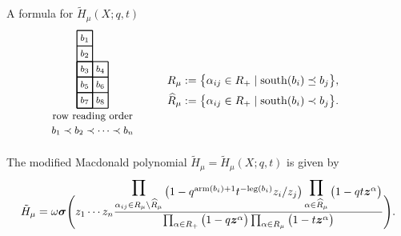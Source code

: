 \documentclass[dvipsnames]{beamer}
\newcommand{\zz}{{\boldsymbol z}}
\newcommand{\sigmabold}{\boldsymbol \sigma}
\newcommand{\Htild}{\tilde{H}}
\DeclareMathOperator{\pol}{pol}
\newcommand{\south}{{\mathrm{south}}}
\newcommand{\leg}{{\mathrm{leg}}}
\newcommand{\arm}{{\mathrm{arm}}}
\theoremstyle{definition}
\begin{document}
\begin{frame}{A formula for \(\Htild_\mu(X;q,t)\)}
  \begin{align*}
\quad \ \ \
\begin{tikzpicture}[scale = .49]
\begin{scope}
\draw[thick] (0,0) grid (1,5);
\draw[thick] (0,0) grid (2,3);
\node at (0.5, 4.5) { \footnotesize $b_1$};
\node at (0.5, 3.5) { \footnotesize $b_2$};
\node at (0.5, 2.5) { \footnotesize $b_3$};
\node at (1.5, 2.5) { \footnotesize $b_4$};
\node at (0.5, 1.5) { \footnotesize $b_5$};
\node at (1.5, 1.5) { \footnotesize $b_6$};
\node at (0.5, 0.5) { \footnotesize $b_7$};
\node at (1.5, 0.5) { \footnotesize $b_8$};
\node at (1,-.54) {\small row reading order };
\node at (1,-1.44) {\small $b_1 \prec b_2 \prec \cdots  \prec b_n$};
\end{scope}
\end{tikzpicture}
\quad  \quad \ \
\raisebox{14mm}{\parbox{7cm}{
 $R_\mu     :=     \big\{ \alpha_{ij} \in R_+ \mid  \south(b_i) \preceq  b_j \big\},$ \\[1.4mm]
$\widehat{R}_\mu  :=  \big\{ \alpha_{ij} \in R_+ \mid  \south(b_i) \prec b_j \big\}$.}}
\end{align*}

\vspace{-4.3mm}
\pause
\begin{theorem}
The modified Macdonald polynomial $\Htild_\mu = \Htild_{\mu }(X;q,t)$ is given by
\vspace{-1mm}
{\small \begin{align*}
          \Htild_\mu =
          \omega \sigmabold \Bigg( z_1 \cdots z_n
\frac{
\displaystyle\prod_{\alpha_{ij} \in R_\mu \setminus \widehat{R}_\mu }
 \raisebox{-1.4mm}{$\big(1- q^{\arm(b_i)+1} t^{-\leg(b_i)} z_i/z_j \big)$}
\displaystyle\prod_{\alpha \in \widehat{R}_{\mu}}
 \raisebox{-1.4mm}{$\big(1-q  t\zz^\alpha \big)$} } {\prod_{\alpha \in R_+} \big(1-q  \zz^\alpha\big)
\prod_{\alpha \in R_\mu} \big(1-t  \zz^\alpha\big)} 
           \Bigg).
\end{align*}}
%
\end{theorem}
\end{frame}
\end{document}
